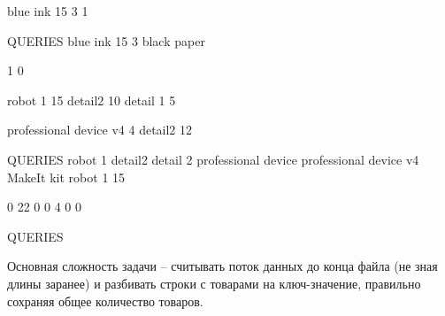 
\begin{myverbbox}[\small]{\vinput}
    blue ink 15 3 1

    QUERIES
    blue ink 15 3
    black paper
\end{myverbbox}

\begin{myverbbox}[\small]{\voutput}
    1
    0
\end{myverbbox}


\begin{myverbbox}[\small]{\vinput}
    robot 1 15
    detail2 10
    detail 1 5
    
    professional device v4 4
    detail2 12
    
    QUERIES
    robot  1
    detail2
    detail 2
    professional device
    professional device v4
    MakeIt kit
    robot 1 15
\end{myverbbox}

\begin{myverbbox}[\small]{\voutput}
    0
    22
    0
    0
    4
    0
    0
\end{myverbbox}


\begin{myverbbox}[\small]{\vinput}
    QUERIES
\end{myverbbox}

\begin{myverbbox}[\small]{\voutput}
    
\end{myverbbox}

\solutionSection

Основная сложность задачи -- считывать поток данных до конца файла (не зная длины заранее) и разбивать строки с товарами на ключ-значение, правильно сохраняя общее количество товаров.

